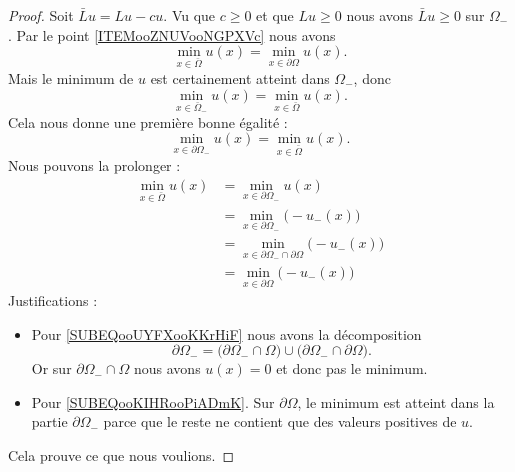 \begin{proof}
    Soit \( \bar Lu=Lu-cu\). Vu que \( c\geq 0\) et que \( Lu\geq 0\) nous avons \( \bar Lu\geq 0\) sur \( \Omega_-\). Par le point \ref{ITEMooZNUVooNGPXVc} nous avons
    \begin{equation}
        \min_{x\in \bar \Omega}u(x)=\min_{x\in\partial\Omega}u(x).
    \end{equation}
    Mais le minimum de \( u\) est certainement atteint dans \( \Omega_-\), donc
    \begin{equation}
        \min_{x\in\bar\Omega_-}u(x)=\min_{x\in\bar\Omega}u(x).
    \end{equation}
    Cela nous donne une première bonne égalité :
    \begin{equation}
        \min_{x\in\partial\Omega_-}u(x)=\min_{x\in\bar \Omega}u(x).
    \end{equation}
    Nous pouvons la prolonger :
    \begin{subequations}
        \begin{align}
            \min_{x\in\bar\Omega}u(x)&=\min_{x\in \partial\Omega_-}u(x)\\
            &=\min_{x\in\partial\Omega_-}\big( -u_-(x) \big)\\
            &=\min_{x\in\partial\Omega_-\cap\partial\Omega}\big( -u_-(x) \big)  \label{SUBEQooUYFXooKKrHiF}\\
            &=\min_{x\in\partial\Omega}\big( -u_-(x) \big)          \label{SUBEQooKIHRooPiADmK}
        \end{align}
    \end{subequations}
    Justifications :
    \begin{itemize}
        \item Pour \eqref{SUBEQooUYFXooKKrHiF} nous avons la décomposition
            \begin{equation}
                \partial \Omega_-=\big( \partial\Omega_-\cap\Omega \big)\cup\big( \partial\Omega_-\cap\partial \Omega \big).
            \end{equation}
            Or sur \( \partial\Omega_-\cap\Omega\) nous avons \( u(x)=0\) et donc pas le minimum.
        \item Pour \eqref{SUBEQooKIHRooPiADmK}. Sur \( \partial\Omega\), le minimum est atteint dans la partie \( \partial\Omega_-\) parce que le reste ne contient que des valeurs positives de \( u\).
    \end{itemize}

    Cela prouve ce que nous voulions.
\end{proof}

